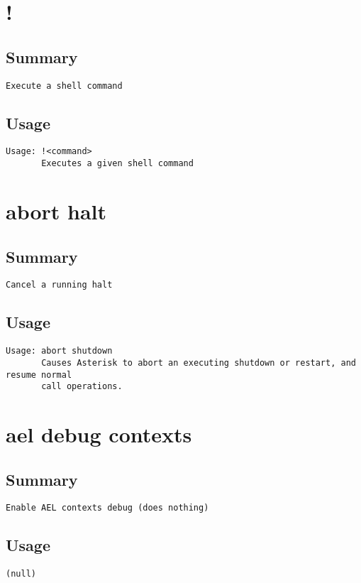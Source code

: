 \section{!}
\subsection{Summary}
\begin{verbatim}
Execute a shell command
\end{verbatim}
\subsection{Usage}
\begin{verbatim}
Usage: !<command>
       Executes a given shell command

\end{verbatim}


\section{abort halt}
\subsection{Summary}
\begin{verbatim}
Cancel a running halt
\end{verbatim}
\subsection{Usage}
\begin{verbatim}
Usage: abort shutdown
       Causes Asterisk to abort an executing shutdown or restart, and resume normal
       call operations.

\end{verbatim}


\section{ael debug contexts}
\subsection{Summary}
\begin{verbatim}
Enable AEL contexts debug (does nothing)
\end{verbatim}
\subsection{Usage}
\begin{verbatim}
(null)
\end{verbatim}


